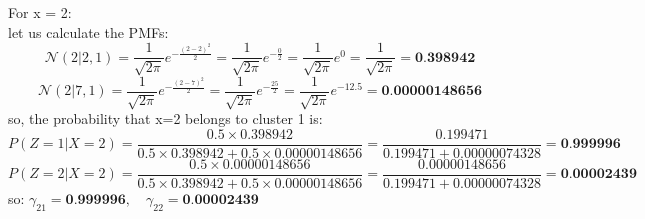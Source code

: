\documentclass{article}
\begin{document}
\begin{enumerate}
For x = 2:
\\ let us calculate the PMFs:
\[
\mathcal{N}(2 | 2, 1) = \frac{1}{\sqrt{2\pi}} e^{-\frac{(2-2)^2}{2}} = \frac{1}{\sqrt{2\pi}} e^{-\frac{0}{2}} = \frac{1}{\sqrt{2\pi}} e^{0} = \frac{1}{\sqrt{2\pi}} = \textbf{0.398942}
\]
\[
\mathcal{N}(2 | 7, 1) = \frac{1}{\sqrt{2\pi}} e^{-\frac{(2-7)^2}{2}} = \frac{1}{\sqrt{2\pi}} e^{-\frac{25}{2}} = \frac{1}{\sqrt{2\pi}} e^{-12.5} = \textbf{0.00000148656}
\]
so, the probability that x=2 belongs to cluster 1 is:
\[
P(Z = 1 | X = 2) = \frac{0.5 \times 0.398942}{0.5 \times 0.398942 + 0.5 \times 0.00000148656} = \frac{0.199471}{0.199471 + 0.00000074328} = \textbf{0.999996}
\]
\[
P(Z = 2 | X = 2) = \frac{0.5 \times 0.00000148656}{0.5 \times 0.398942 + 0.5 \times 0.00000148656} = \frac{0.00000148656}{0.199471 + 0.00000074328} = \textbf{0.00002439}
\]
so: $\gamma_{21} = \textbf{0.999996}, \quad \gamma_{22} = \textbf{0.00002439}$


\end{enumerate}
\end{document}
